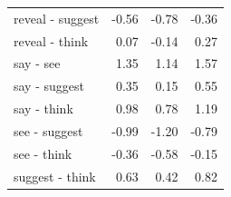 \begin{longtable}{lrrr}
  reveal - suggest & -0.56 & -0.78 & -0.36 \\ 
  reveal - think & 0.07 & -0.14 & 0.27 \\ 
  say - see & 1.35 & 1.14 & 1.57 \\ 
  say - suggest & 0.35 & 0.15 & 0.55 \\ 
  say - think & 0.98 & 0.78 & 1.19 \\ 
  see - suggest & -0.99 & -1.20 & -0.79 \\ 
  see - think & -0.36 & -0.58 & -0.15 \\ 
  suggest - think & 0.63 & 0.42 & 0.82 \\ 
  \end{longtable}


